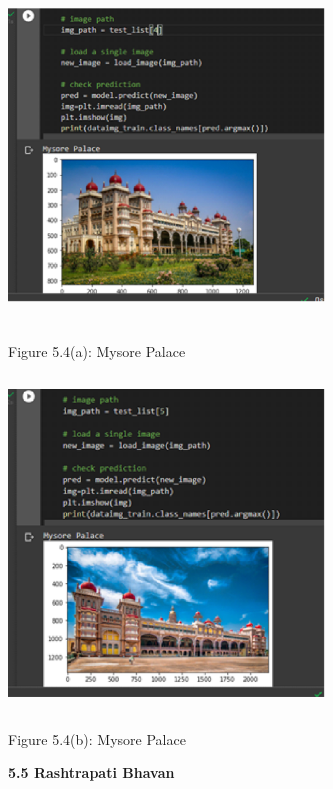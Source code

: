 \documentclass[10pt]{article} %
\begin{document}
\noindent \includegraphics*[width=3.3in, height=3.5in, keepaspectratio=false]{image12}

\noindent Figure 5.4(a): Mysore Palace

\noindent 

\noindent \includegraphics*[width=3.3in, height=3.5in, keepaspectratio=false]{image13}

\noindent Figure 5.4(b): Mysore Palace

\noindent 

\newpage 
\noindent \textbf {5.5 Rashtrapati Bhavan}
\end{document}
